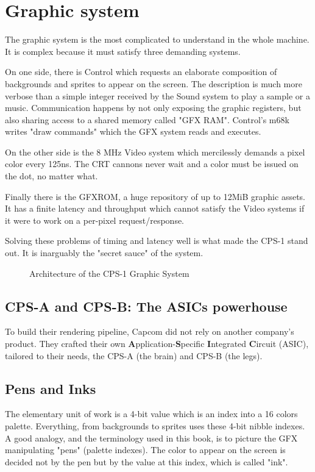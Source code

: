\section{Graphic system}

The graphic system is the most complicated to understand in the whole machine. It is complex because it must satisfy three demanding systems.



On one side, there is Control which requests an elaborate composition of backgrounds and sprites to appear on the screen. The description is much more verbose than a simple integer received by the Sound system to play a sample or a music. Communication happens by not only exposing the graphic registers, but also sharing access to a shared memory called "GFX RAM". Control's m68k writes "draw commands" which the GFX system reads and executes.

On the other side is the 8 MHz Video system which mercilessly demands a pixel color every 125ns. The CRT cannons never wait and a color must be issued on the dot, no matter what. 

Finally there is the GFXROM, a huge repository of up to 12MiB graphic assets. It has a finite latency and throughput which cannot satisfy the Video systems if it were to work on a per-pixel request/response.

Solving these problems of timing and latency well is what made the CPS-1 stand out. It is inarguably the "secret sauce" of the system. 

\begin{figure}[H]
\caption*{Architecture of the CPS-1 Graphic System}
\end{figure}


\subsection{CPS-A and CPS-B: The ASICs powerhouse}
To build their rendering pipeline, Capcom did not rely on another company's product. They crafted their own \textbf{A}pplication-\textbf{S}pecific \textbf{I}ntegrated \textbf{C}ircuit (ASIC), tailored to their needs, the CPS-A (the brain) and CPS-B (the legs).





\subsection{Pens and Inks}
The elementary unit of work is a 4-bit value which is an index into a 16 colors palette. Everything, from backgrounds to sprites uses these 4-bit nibble indexes. A good analogy, and the terminology used in this book, is to picture the GFX manipulating "pens" (palette indexes). The color to appear on the screen is decided not by the pen but by the value at this index, which is called "ink".


